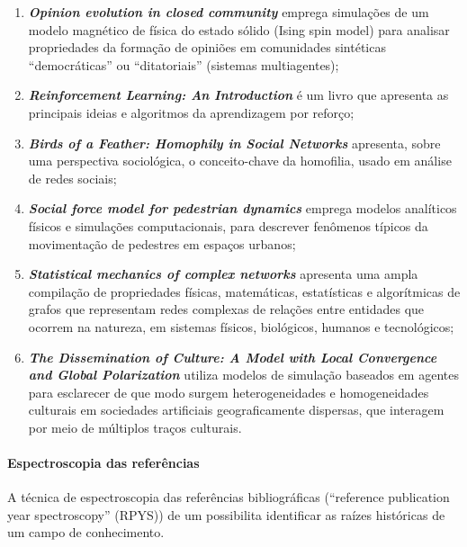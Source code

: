 \begin{enumerate}
\item \textit{\textbf{Opinion evolution in closed community}} \citep{sznajd-weron_opinion_2000} emprega simulações de um modelo magnético de física do estado sólido (Ising spin model) para analisar propriedades da formação de opiniões em comunidades sintéticas ``democráticas'' ou  ``ditatoriais'' (sistemas multiagentes);

\item \textit{\textbf{Reinforcement Learning: An Introduction}} \citep{sutton_reinforcement_2014} é um livro que apresenta as principais ideias e algoritmos da aprendizagem por reforço;

\item \textit{\textbf{Birds of a Feather: Homophily in Social Networks}} \citep{mcpherson_birds_2001} apresenta, sobre uma perspectiva sociológica, o conceito-chave da homofilia, usado em análise de redes sociais;


\item \textit{\textbf{Social force model for pedestrian dynamics}} \citep{helbing_social_1995} emprega modelos analíticos físicos e simulações computacionais, para descrever fenômenos típicos da movimentação de pedestres em espaços urbanos;

\item \textit{\textbf{Statistical mechanics of complex networks}} \citep{albert_statistical_2002}  apresenta uma ampla compilação de propriedades físicas, matemáticas, estatísticas e algorítmicas de grafos que representam redes complexas de relações entre entidades que ocorrem na natureza, em sistemas físicos, biológicos, humanos e tecnológicos;

\item \textit{\textbf{The Dissemination of Culture: A Model with Local Convergence and Global Polarization
}} \citep{axelrod_dissemination_1997} utiliza modelos de simulação baseados em agentes para esclarecer de que modo surgem heterogeneidades e homogeneidades culturais em sociedades artificiais geograficamente dispersas, que interagem por meio de múltiplos traços culturais.
\end{enumerate}

\paragraph{Espectroscopia das referências}

A técnica de espectroscopia das referências bibliográficas (``reference publication year spectroscopy'' (RPYS)) de um \dataset\cite{marx_detecting_2014} possibilita identificar as raízes históricas  de um campo de conhecimento. 


